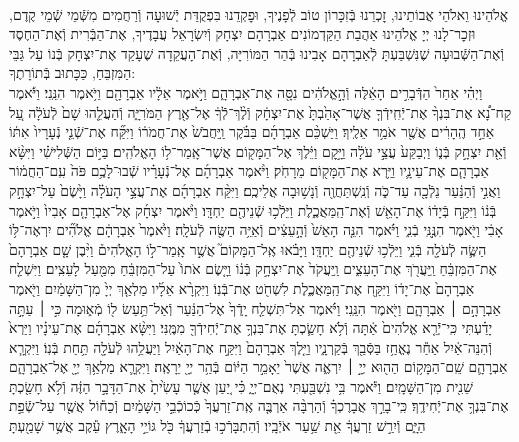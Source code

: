 \documentclass[twoside, openany, parskip=half, 11pt]{book}
\begin{document}
\\
אֱלֹהֵינוּ וֵאלֹהֵי אֲבוֹתֵינוּ, זׇכְרֵנוּ בְּֿזִכָּרוֹן טוֹב לְֿפָנֶיךָ, וּפׇקְדֵנוּ בִּפְקֻדַּת יְֿשׁוּעָה וְֿרַחֲמִים מִשְּֿׁמֵי שְֿׁמֵי קֶדֶם, וּזְכׇר־לָנוּ יְיָ אֱלֹהֵינוּ אַהֲבַת הַקַּדְמוֹנִים אַבְרָהָם יִצְחָק וְֿיִשְׂרָאֵל עֲבָדֶיךָ, אֶת־הַבְּֿרִית וְֿאֶת־הַחֶסֶד וְֿאֶת־הַשְּֿׁבוּעָה שֶׁנִּשְׁבַּעְתָּ לְֿאַבְרָהָם אָבִינוּ בְּֿהַר הַמּוֹרִיָּה, וְֿאֶת־הָעֲקֵדָה שֶׁעָקַד אֶת־יִצְחָק בְּֿנוֹ עַל גַּבֵּי הַמִּזְבֵּחַ, כַּכָּתוּב בְּֿתוֹרָתֶךָ:\\
וַיְהִ֗י אַחַר֙ הַדְּֿבָרִ֣ים הָאֵ֔לֶּה  וְֿהָ֣אֱלֹהִ֔ים נִסָּ֖ה אֶת־אַבְרָהָ֑ם וַיֹּ֣אמֶר אֵלָ֔יו אַבְרָהָ֖ם וַיֹּ֥אמֶר הִנֵּֽנִי׃ וַיֹּ֡אמֶר קַח־נָ֠א אֶת־בִּנְךָ֨ אֶת־יְֿחִֽידְֿךָ֤ אֲשֶׁר־אָהַ֙בְתָּ֙ אֶת־יִצְחָ֔ק וְֿלֶ֨ךְ־לְֿֿךָ֔ אֶל־אֶ֖רֶץ הַמֹּרִיָּ֑ה וְֿהַעֲלֵ֤הוּ שָׁם֙ לְֿעֹלָ֔ה עַ֚ל אַחַ֣ד הֶֽהָרִ֔ים אֲשֶׁ֖ר אֹמַ֥ר אֵלֶֽיךָ׃ וַיַּשְׁכֵּ֨ם אַבְרָהָ֜ם בַּבֹּ֗קֶר וַֽיַּחֲבֹשׁ֙ אֶת־חֲמֹר֔וֹ וַיִּקַּ֞ח אֶת־שְֿׁנֵ֤י נְֿעָרָיו֙ אִתּ֔וֹ וְֿאֵ֖ת יִצְחָ֣ק בְּֿנ֑וֹ וַיְבַקַּע֙ עֲצֵ֣י עֹלָ֔ה וַיָּ֣קׇם וַיֵּ֔לֶךְ אֶל־הַמָּק֖וֹם אֲשֶׁר־אָֽמַר־ל֥וֹ הָאֱלֹהִֽים׃ בַּיּ֣וֹם הַשְּֿׁלִישִׁ֗י וַיִּשָּׂ֨א אַבְרָהָ֧ם אֶת־עֵינָ֛יו וַיַּ֥רְא אֶת־הַמָּק֖וֹם מֵרָחֹֽק׃ וַיֹּ֨אמֶר אַבְרָהָ֜ם אֶל־נְֿעָרָ֗יו שְֿׁבוּ־לָכֶ֥ם פֹּה֙ עִֽם־הַחֲמ֔וֹר וַאֲנִ֣י וְֿהַנַּ֔עַר נֵלְֿכָ֖ה עַד־כֹּ֑ה וְֿנִֽשְׁתַּחֲוֶ֖ה וְֿנָשׁ֥וּבָה אֲלֵיכֶֽם׃ וַיִּקַּ֨ח אַבְרָהָ֜ם אֶת־עֲצֵ֣י הָעֹלָ֗ה וַיָּ֙שֶׂם֙ עַל־יִצְחָ֣ק בְּֿנ֔וֹ וַיִּקַּ֣ח בְּֿיָד֔וֹ אֶת־הָאֵ֖שׁ וְֿאֶת־הַֽמַּאֲכֶ֑לֶת וַיֵּלְֿכ֥וּ שְֿׁנֵיהֶ֖ם יַחְדָּֽו׃ וַיֹּ֨אמֶר יִצְחָ֜ק אֶל־אַבְרָהָ֤ם אָבִיו֙ וַיֹּ֣אמֶר אָבִ֔י וַיֹּ֖אמֶר הִנֶּ֣נִּֽי בְֿנִ֑י וַיֹּ֗אמֶר הִנֵּ֤ה הָאֵשׁ֙ וְֿהָ֣עֵצִ֔ים וְֿאַיֵּ֥ה הַשֶּׂ֖ה לְֿעֹלָֽה׃ וַיֹּ֙אמֶר֙ אַבְרָהָ֔ם אֱלֹהִ֞ים יִרְאֶה־לּ֥וֹ הַשֶּׂ֛ה לְֿעֹלָ֖ה בְּֿנִ֑י וַיֵּלְֿכ֥וּ שְֿׁנֵיהֶ֖ם יַחְדָּֽו׃ וַיָּבֹ֗אוּ אֶֽל־הַמָּקוֹם֮ אֲשֶׁ֣ר אָֽמַר־ל֣וֹ הָאֱלֹהִים֒ וַיִּ֨בֶן שָׁ֤ם אַבְרָהָם֙ אֶת־הַמִּזְבֵּ֔חַ וַֽיַּעֲרֹ֖ךְ אֶת־הָעֵצִ֑ים וַֽיַּעֲקֹד֙ אֶת־יִצְחָ֣ק בְּֿנ֔וֹ וַיָּ֤שֶׂם אֹתוֹ֙ עַל־הַמִּזְבֵּ֔חַ מִמַּ֖עַל לָעֵצִֽים׃ וַיִּשְׁלַ֤ח אַבְרָהָם֙ אֶת־יָד֔וֹ וַיִּקַּ֖ח אֶת־הַֽמַּאֲכֶ֑לֶת לִשְׁחֹ֖ט אֶת־בְּֿנֽוֹ׃ וַיִּקְרָ֨א אֵלָ֜יו מַלְאַ֤ךְ יְיָ֙ מִן־הַשָּׁמַ֔יִם וַיֹּ֖אמֶר אַבְרָהָ֣ם ׀ אַבְרָהָ֑ם וַיֹּ֖אמֶר הִנֵּֽנִי׃ וַיֹּ֗אמֶר אַל־תִּשְׁלַ֤ח יָֽדְֿךָ֙ אֶל־הַנַּ֔עַר וְֿאַל־תַּ֥עַשׂ ל֖וֹ מְֿא֑וּמָה כִּ֣י ׀ עַתָּ֣ה יָדַ֗עְתִּי כִּֽי־יְֿֿרֵ֤א אֱלֹהִים֙ אַ֔תָּה וְֿלֹ֥א חָשַׂ֛כְתָּ אֶת־בִּנְךָ֥ אֶת־יְֿחִידְֿךָ֖ מִמֶּֽנִּי׃ וַיִּשָּׂ֨א אַבְרָהָ֜ם אֶת־עֵינָ֗יו וַיַּרְא֙ וְֿהִנֵּה־אַ֔יִל אַחַ֕ר נֶאֱחַ֥ז בַּסְּֿבַ֖ךְ בְּֿקַרְנָ֑יו וַיֵּ֤לֶךְ אַבְרָהָם֙ וַיִּקַּ֣ח אֶת־הָאַ֔יִל וַיַּעֲלֵ֥הוּ לְֿעֹלָ֖ה תַּ֥חַת בְּֿנֽוֹ׃ וַיִּקְרָ֧א אַבְרָהָ֛ם שֵֽׁם־הַמָּק֥וֹם הַה֖וּא יְיָ֣ ׀ יִרְאֶ֑ה אֲשֶׁר֙ יֵאָמֵ֣ר הַיּ֔וֹם בְּֿהַ֥ר יְיָ֖ יֵרָאֶֽה׃ וַיִּקְרָ֛א מַלְאַ֥ךְ יְיָ֖ אֶל־אַבְרָהָ֑ם שֵׁנִ֖ית מִן־הַשָּׁמָֽיִם׃ וַיֹּ֕אמֶר בִּ֥י נִשְׁבַּ֖עְתִּי נְאֻם־יְיָ֑ כִּ֗י יַ֚עַן אֲשֶׁ֤ר עָשִׂ֙יתָ֙ אֶת־הַדָּבָ֣ר הַזֶּ֔ה וְֿלֹ֥א חָשַׂ֖כְתָּ אֶת־בִּנְךָ֥ אֶת־יְֿחִידֶֽךָ׃ כִּֽי־בָרֵ֣ךְ אֲבָרֶכְךָ֗ וְֿהַרְבָּ֨ה אַרְבֶּ֤ה אֶֽת־זַרְעֲךָ֙ כְּֿכוֹכְֿבֵ֣י הַשָּׁמַ֔יִם וְֿכַח֕וֹל אֲשֶׁ֖ר עַל־שְֿׂפַ֣ת הַיָּ֑ם וְֿיִרַ֣שׁ זַרְעֲךָ֔ אֵ֖ת שַׁ֥עַר אֹיְֿבָֽיו׃ וְֿהִתְבָּרְֿכ֣וּ בְֿזַרְעֲךָ֔ כֹּ֖ל גּוֹיֵ֣י הָאָ֑רֶץ עֵ֕קֶב אֲשֶׁ֥ר שָׁמַ֖עְתָּ 
\end{document}
